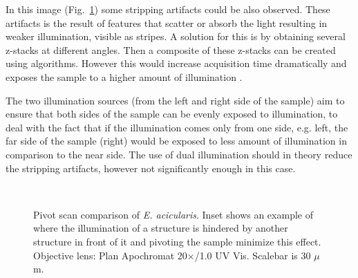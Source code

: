 In this image (Fig.~\ref{fig:Elepiv}) some stripping artifacts could be also observed. 
These artifacts is the result of features that scatter or absorb the light resulting in weaker illumination, visible as stripes. 
A solution for this is by obtaining several z-stacks at different angles. 
Then a composite of these z-stacks can be created using algorithms. 
However this would increase acquisition time dramatically and exposes the sample to a higher amount of illumination \cite{NikonLS}. 

The two illumination sources (from the left and right side of the sample) aim to ensure that both sides of the sample can be evenly exposed to illumination, to deal with the fact that if the illumination comes only from one side, e.g. left, the far side of the sample (right) would be exposed to less amount of illumination in comparison to the near side. 
The use of dual illumination should in theory reduce the stripping artifacts, however not significantly enough in this case. 

\begin{figure}[h!]
\centering
{}\hspace{.1mm}
\\
\caption{Pivot scan comparison of \textit{E. acicularis}. 
Inset shows an example of where the illumination of a structure is hindered by another structure in front of it and pivoting the sample minimize this effect. 
Objective lens: Plan Apochromat 20$\times$/1.0 UV Vis. 
Scalebar is 30 $\mu$m.}
\label{fig:Elepiv}
\end{figure}

